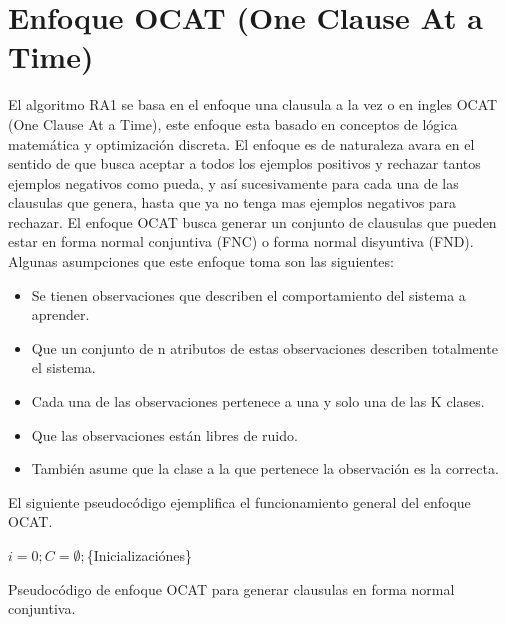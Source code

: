 \section{Enfoque OCAT (One Clause At a Time)}

El algoritmo RA1 se basa en el enfoque una clausula a la vez o en ingles OCAT (One Clause At a Time), este enfoque esta basado en conceptos de lógica matemática y optimización discreta. El enfoque es de naturaleza avara en el sentido de que busca aceptar a todos los ejemplos positivos y rechazar tantos ejemplos negativos como pueda, y así sucesivamente para cada una de las clausulas que genera, hasta que ya no tenga mas ejemplos negativos para rechazar. El enfoque OCAT busca generar un conjunto de clausulas que pueden estar en forma normal conjuntiva (FNC) o forma normal disyuntiva (FND).
\\
Algunas asumpciones que este enfoque toma son las siguientes:

\begin{itemize}
	\item Se tienen observaciones que describen el comportamiento del sistema a aprender.
	\item Que un conjunto de n atributos de estas observaciones describen totalmente el sistema.
	\item Cada una de las observaciones pertenece a una y solo una de las K clases.
	\item Que las observaciones están libres de ruido.
	\item También asume que la clase a la que pertenece la observación es la correcta. 
\end{itemize}

El siguiente pseudocódigo ejemplifica el funcionamiento general del enfoque OCAT.

\begin{algorithm}[H] 
	
	\SetAlgoLined
	$i = 0; C=\emptyset;$\{Inicializaciónes\}\;
	
	\caption{Pseudocódigo de enfoque OCAT para generar clausulas en forma normal conjuntiva.}
\end{algorithm}

